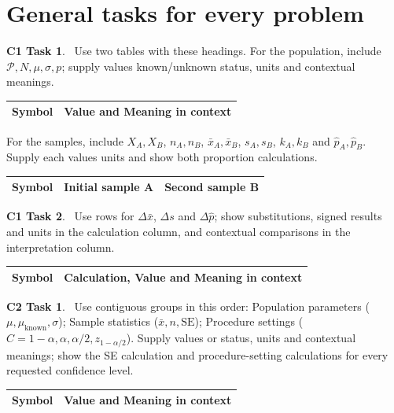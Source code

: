 \section*{General tasks for every problem}

\begingroup\small
\textbf{C1 Task 1}. \cOneA\ Use two tables with these headings. For the population, include $\mathcal P,N,\mu,\sigma,p$; supply values known/unknown status, units and contextual meanings.

\vspace{-3mm}
\begin{center}
\begin{tabularx}{\linewidth}{@{}l | K@{}}
\toprule
\textbf{Symbol} & \textbf{Value and Meaning in context}\\
\bottomrule
\end{tabularx}
\end{center}

For the samples, include $X_A,X_B$, $n_A,n_B$, $\bar x_A,\bar x_B$, $s_A,s_B$, $k_A,k_B$ and $\hat p_A,\hat p_B$. Supply each values units and show both proportion calculations.
\begin{center}
\begin{tabularx}{\linewidth}{@{}l | K | K@{}}
\toprule
\textbf{Symbol} & \textbf{Initial sample A} & \textbf{Second sample B}\\
\bottomrule
\end{tabularx}
\end{center}

 

\textbf{C1 Task 2}. \cOneB\ Use rows for $\Delta\bar x$, $\Delta s$ and $\Delta\hat p$; show substitutions, signed results and units in the calculation column, and contextual comparisons in the interpretation column.
\begin{center}
\begin{tabularx}{\linewidth}{@{}l | K@{}}
\toprule
\textbf{Symbol} &  \textbf{Calculation, Value and Meaning in context} \\
\bottomrule
\end{tabularx}
\end{center}

\textbf{C2 Task 1}. \cTwoA\ Use contiguous groups in this order: Population parameters ($\mu,\mu_{\mathrm{known}},\sigma$); Sample statistics ($\bar x,n,\mathrm{SE}$); Procedure settings ($C=1-\alpha,\alpha,\alpha/2,z_{1-\alpha/2}$). Supply values or status, units and contextual meanings; show the SE calculation and procedure-setting calculations for every requested confidence level.
\begin{center}
\begin{tabularx}{\linewidth}{@{}l | K@{}}
\toprule
\textbf{Symbol} & \textbf{Value and Meaning in context}\\
\bottomrule
\end{tabularx}
\end{center}

